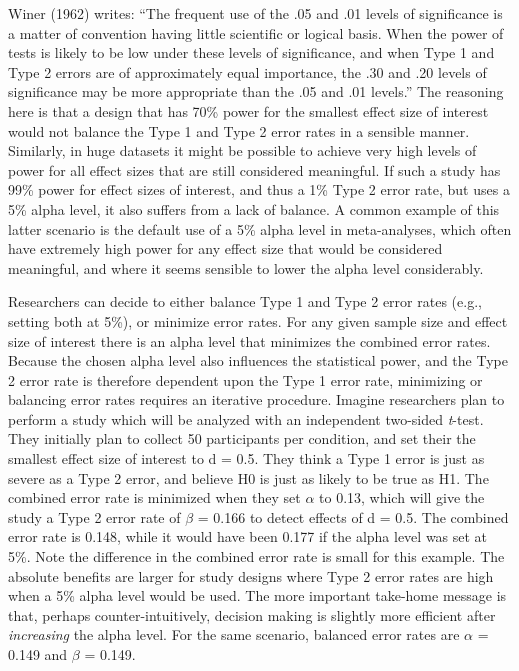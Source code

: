 \documentclass[,jou,floatsintext]{apa6}
\begin{document}
Winer (1962) writes: \enquote{The frequent use of the .05 and .01 levels of significance is a matter of convention having little scientific or logical basis. When the power of tests is likely to be low under these levels of significance, and when Type 1 and Type 2 errors are of approximately equal importance, the .30 and .20 levels of significance may be more appropriate than the .05 and .01 levels.} The reasoning here is that a design that has 70\% power for the smallest effect size of interest would not balance the Type 1 and Type 2 error rates in a sensible manner. Similarly, in huge datasets it might be possible to achieve very high levels of power for all effect sizes that are still considered meaningful. If such a study has 99\% power for effect sizes of interest, and thus a 1\% Type 2 error rate, but uses a 5\% alpha level, it also suffers from a lack of balance. A common example of this latter scenario is the default use of a 5\% alpha level in meta-analyses, which often have extremely high power for any effect size that would be considered meaningful, and where it seems sensible to lower the alpha level considerably.

Researchers can decide to either balance Type 1 and Type 2 error rates (e.g., setting both at 5\%), or minimize error rates. For any given sample size and effect size of interest there is an alpha level that minimizes the combined error rates. Because the chosen alpha level also influences the statistical power, and the Type 2 error rate is therefore dependent upon the Type 1 error rate, minimizing or balancing error rates requires an iterative procedure. Imagine researchers plan to perform a study which will be analyzed with an independent two-sided \emph{t}-test. They initially plan to collect 50 participants per condition, and set their the smallest effect size of interest to d = 0.5. They think a Type 1 error is just as severe as a Type 2 error, and believe H0 is just as likely to be true as H1. The combined error rate is minimized when they set \(\alpha\) to 0.13, which will give the study a Type 2 error rate of \(\beta\) = 0.166 to detect effects of d = 0.5. The combined error rate is 0.148, while it would have been 0.177 if the alpha level was set at 5\%. Note the difference in the combined error rate is small for this example. The absolute benefits are larger for study designs where Type 2 error rates are high when a 5\% alpha level would be used. The more important take-home message is that, perhaps counter-intuitively, decision making is slightly more efficient after \emph{increasing} the alpha level. For the same scenario, balanced error rates are \(\alpha\) = 0.149 and \(\beta\) = 0.149.
\end{document}
